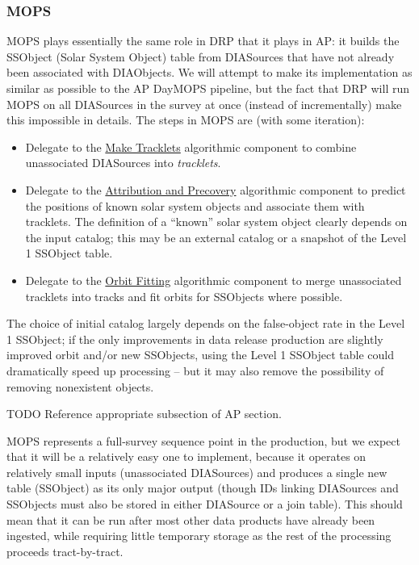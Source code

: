 \subsubsection{MOPS}
\label{sec:drpMOPS}

MOPS plays essentially the same role in DRP that it plays in AP: it builds the SSObject (Solar System Object) table from DIASources that have not already been associated with DIAObjects.  We will attempt to make its implementation as similar as possible to the AP DayMOPS pipeline, but the fact that DRP will run MOPS on all DIASources in the survey at once (instead of incrementally) make this impossible in details.  The steps in MOPS are (with some iteration):

\begin{itemize}
\item Delegate to the \hyperref[sec:acMakeTracklets]{Make Tracklets} algorithmic component to combine unassociated DIASources into \emph{tracklets}.
\item Delegate to the \hyperref[sec:acAttributionAndPrecovery]{Attribution and Precovery} algorithmic component to predict the positions of known solar system objects and associate them with tracklets.  The definition of a ``known'' solar system object clearly depends on the input catalog; this may be an external catalog or a snapshot of the Level 1 SSObject table.
\item Delegate to the \hyperref[sec:acOrbitFitting]{Orbit Fitting} algorithmic component to merge unassociated tracklets into tracks and fit orbits for SSObjects where possible.
\end{itemize}

The choice of initial catalog largely depends on the false-object rate in the Level 1 SSObject; if the only improvements in data release production are slightly improved orbit and/or new SSObjects, using the Level 1 SSObject table could dramatically speed up processing -- but it may also remove the possibility of removing nonexistent objects.

\begin{note}{TODO}
Reference appropriate subsection of AP section.
\end{note}

MOPS represents a full-survey sequence point in the production, but we expect that it will be a relatively easy one to implement, because it operates on relatively small inputs (unassociated DIASources) and produces a single new table (SSObject) as its only major output (though IDs linking DIASources and SSObjects must also be stored in either DIASource or a join table).  This should mean that it can be run after most other data products have already been ingested, while requiring little temporary storage as the rest of the processing proceeds tract-by-tract.

